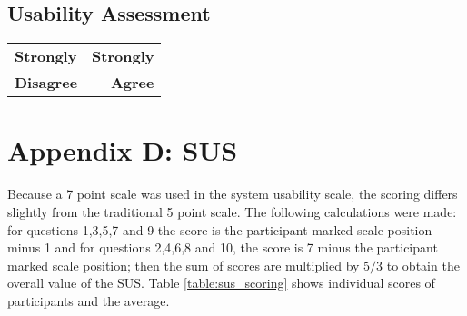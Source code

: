 \subsection*{Usability Assessment}

\hspace*{0.47\textwidth}%
\begin{tabularx}{0.5\textwidth}{@{}LR@{}}
    \textbf{Strongly} & \textbf{Strongly} \\
    \textbf{Disagree} & \textbf{Agree} \\
\end{tabularx}

\begin{enumerate}









\end{enumerate}

\clearpage

\section*{Appendix D: SUS}\label{appendix:sus}

Because a 7 point scale was used in the system usability scale, the scoring
differs slightly from the traditional 5 point scale. The following calculations were made:
for questions 1,3,5,7 and 9 the score is the participant marked scale position minus 1 and
for questions 2,4,6,8 and 10, the score is 7 minus the participant marked scale position;
then the sum of scores are multiplied by $5/3$ to obtain the overall value of the SUS.
Table \ref{table:sus_scoring} shows individual scores of participants and the average.


